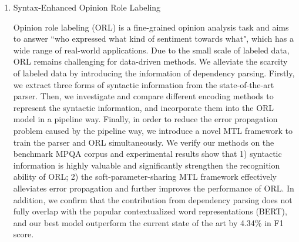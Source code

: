 \begin{eabstract}
\begin{enumerate}
        \item Syntax-Enhanced Opinion Role Labeling

              Opinion role labeling (ORL) is a ﬁne-grained opinion analysis task and aims to answer ``who expressed what kind of sentiment towards what", which has a wide range of real-world applications.
              Due to the small scale of labeled data, ORL remains challenging for data-driven methods.
              We alleviate the scarcity of labeled data by introducing the information of dependency parsing.
              Firstly, we extract three forms of syntactic information from the state-of-the-art parser.
              Then, we investigate and compare different encoding methods to represent the syntactic information, and incorporate them into the ORL model in a pipeline way.
              Finally, in order to reduce the error propagation problem caused by the pipeline way, we introduce a novel MTL framework to train the parser and ORL simultaneously.
              We verify our methods on the benchmark MPQA corpus and experimental results show that 1) syntactic information is highly valuable and significantly strengthen the recognition ability of ORL; 2) the soft-parameter-sharing MTL framework effectively alleviates error propagation and further improves the performance of ORL.
              In addition, we confirm that the contribution from dependency parsing does not fully overlap with the popular contextualized word representations (BERT), and our best model outperform the current state of the art by 4.34\% in F1 score.



\end{enumerate}
\end{eabstract}
